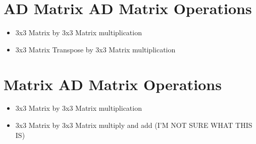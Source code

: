 \documentclass[11pt]{article}
\begin{document}
\section{AD Matrix AD Matrix Operations}\label{sec:ad-matrix-ad-matrix-operations}
    \begin{itemize}
        \item 3x3 Matrix by 3x3 Matrix multiplication
        \item 3x3 Matrix Transpose by 3x3 Matrix multiplication
    \end{itemize}

\section{Matrix AD Matrix Operations}\label{sec:matrix-ad-matrix-operations}
    \begin{itemize}
        \item 3x3 Matrix by 3x3 Matrix multiplication
        \item 3x3 Matrix by 3x3 Matrix multiply and add (I'M NOT SURE WHAT THIS IS)
    \end{itemize}
\end{document}
